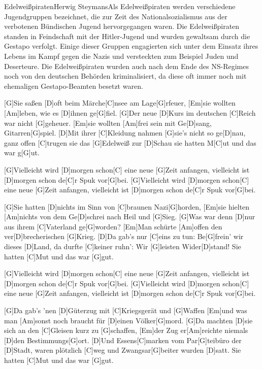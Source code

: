 \documentclass[../main.tex]{subfiles}
\begin{document}
\begin{song}{Edelweißpiraten}{Herwig Steymans}{Als \glqq Edelweißpiraten\grqq{} werden verschiedene Jugendgruppen bezeichnet, die zur Zeit des Nationalsozialismus aus der verbotenen Bündischen Jugend hervorgegangen waren. Die Edelweißpiraten standen in Feindschaft mit der Hitler-Jugend und wurden gewaltsam durch die Gestapo verfolgt. Einige dieser Gruppen engagierten sich unter dem Einsatz ihres Lebens im Kampf gegen die Nazis und versteckten zum Beispiel Juden und Deserteure. Die Edelweißpiraten wurden auch nach dem Ende des NS-Regimes noch von den deutschen Behörden kriminalisiert, da diese oft immer noch mit ehemaligen Gestapo-Beamten besetzt waren.}

[G]Sie saßen [D]oft beim Märche[C]nsee am Lage[G]rfeuer,
[Em]sie wollten [Am]leben, wie es [D]ihnen ge[G]fiel.
[G]Der neue [D]Kurs im deutschen [C]Reich war nicht [G]geheuer.
[Em]sie wollten [Am]frei sein mit Ge[D]sang, Gitarren[G]spiel.
[D]Mit ihrer [C]Kleidung nahmen [G]sie's nicht so ge[D]nau,
ganz offen [C]trugen sie das [G]Edelweiß zur [D]Schau
sie hatten M[C]ut und das war g[G]ut.

[G]Vielleicht wird [D]morgen schon[C] eine neue [G]Zeit anfangen,
vielleicht ist [D]morgen schon de[C]r Spuk vor[G]bei.
[G]Vielleicht wird [D]morgen schon[C] eine neue [G]Zeit anfangen,
vielleicht ist [D]morgen schon de[C]r Spuk vor[G]bei.

[G]Sie hatten [D]nichts im Sinn von [C]braunen Nazi[G]horden,
[Em]sie hielten [Am]nichts von dem Ge[D]schrei nach Heil und [G]Sieg.
[G]Was war denn [D]nur aus ihrem [C]Vaterland ge[G]worden?
[Em]Man schürte [Am]offen den ver[D]brecherischen [G]Krieg.
[D]Da gab's nur [C]eins zu tun: Be[G]frein' wir dieses [D]Land,
da durfte [C]keiner ruhn': Wir [G]leisten Wider[D]stand!
Sie hatten [C]Mut und das war [G]gut.

[G]Vielleicht wird [D]morgen schon[C] eine neue [G]Zeit anfangen,
vielleicht ist [D]morgen schon de[C]r Spuk vor[G]bei.
[G]Vielleicht wird [D]morgen schon[C] eine neue [G]Zeit anfangen,
vielleicht ist [D]morgen schon de[C]r Spuk vor[G]bei.

[G]Da gab's 'nen [D]Güterzug mit [C]Kriegsgerät und [G]Waffen
[Em]und was man [Am]sonst noch braucht für [D]einen Völker[G]mord.
[G]Da machten [D]sie sich an den [C]Gleisen kurz zu [G]schaffen,
[Em]der Zug er[Am]reichte niemals [D]den Bestimmungs[G]ort.
[D]Und Essens[C]marken vom Par[G]teibüro der [D]Stadt,
waren plötzlich [C]weg und Zwangsar[G]beiter wurden [D]satt.
Sie hatten [C]Mut und das war [G]gut.\pagebreak


\end{song}
\end{document}
